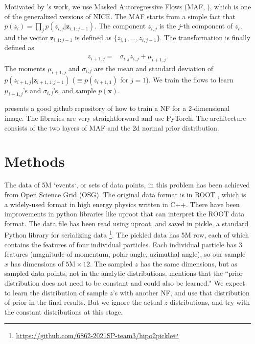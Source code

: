 Motivated by \citet{stan}'s work, we use Masked Autoregressive Flows (MAF, \citet{papamakarios2018masked}), which is one of the generalized versions of NICE. The MAF starts from a simple fact that $p(z_{i}) = \prod\limits_{j}p(z_{i,j}|\mathbf{z}_{i,1:j-1})$. The component $z_{i,j}$ is the $j$-th component of $z_i$, and the vector $\mathbf{z}_{i,1:j-1}$ is defined as $\{z_{i, 1}, ..., z_{i, j-1}\}$. The transformation is finally defined as
\begin{align}
    z_{i+1, j}=& \sigma_{i, j} z_{i, j} + \mu_{i+1, j}.
\end{align}
The moments $\mu_{i+1, j}$ and $\sigma_{i, j}$ are the mean and standard deviation of $p(z_{i+1,j}|\mathbf{z}_{i+1,1:j-1})$ ($\equiv p(z_{i+1,1})$ for $j=1$). We train the flows to learn $\mu_{i+1, j}$'s and $\sigma_{i, j}$'s, and sample $p(\mathbf{x})$.

\citet{papamakarios2018masked} presents a good github repository of how to train a NF for a 2-dimensional image. The libraries are very straightforward and use PyTorch. The architecture consists of the two layers of MAF and the 2d normal prior distribution.

\section{Methods}
The data of 5M `events`, or sets of data points, in this problem has been achieved from Open Science Grid (OSG). The original data format is in ROOT \cite{root}, which is a widely-used format in high energy physics written in C++. There have been improvements in python libraries like uproot \cite{uproot} that can interpret the ROOT data format. The data file has been read using uproot, and saved in pickle, a standard Python library for serializing data \footnote{\url{https://github.com/6862-2021SP-team3/hipo2pickle}}. The pickled data has 5M row, each of which contains the features of four individual particles. Each individual particle has 3 features (magnitude of momentum, polar angle, azimuthal angle), so our sample $x$ has dimensions of $5\text{M}\times12$. The sampled $z$ has the same dimensions, but as sampled data points, not in the analytic distributions. \citet{Dinh15} mentions that the ``prior distribution does not need to be constant and could also be learned." We expect to learn the distribution of sample $z$'s with another NF, and use that distribution of prior in the final results. But we ignore the actual $z$ distributions, and try with the constant distributions at this stage.

